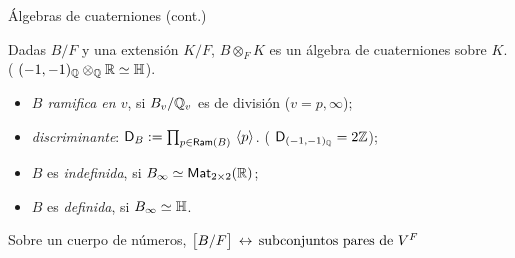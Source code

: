 \begin{frame}{\'{A}lgebras de cuaterniones (cont.)}
	\begin{obsExtension}\label{obs:extension}
		Dadas $B/F$ y una extensi\'{o}n $K/F$, $B\otimes_F K$ es un
		\'{a}lgebra de cuaterniones sobre $K$. (%
		\begin{math}
			\quatalg[\bb Q]{-1,-1}\otimes_{\bb Q}\bb R\simeq\bb H
		\end{math}).
	\end{obsExtension}

	\begin{defRamifica}\label{def:ramifica}
		\begin{itemize}
			\item\emph{$B$ ramifica en $v$}, si $B_v/\bb Q_v$ es de
				divisi\'{o}n ($v=p,\infty$);
			\item\emph{discriminante}:
				\begin{math}
					\disc[B]:=\prod_{p\in\Ram(B)}\,
						\generado{p}
				\end{math}. (%
				\begin{math}
					\disc[{\quatalg[\bb Q]{-1,-1}}]=2\bb Z
				\end{math});
			\item $B$ es \emph{indefinida}, si
				$B_\infty\simeq\MM[2\times2](\bb R)$;
			\item $B$ es \emph{definida}, si
				$B_{\infty}\simeq\bb H$.
		\end{itemize}
	\end{defRamifica}

	\begin{teoClasificacion}%
		\label{thm:clasificacionglobal}
		Sobre un cuerpo de n\'{u}meros,
		\begin{math}
			\big[B/F\big] \,\leftrightarrow\,
				\text{subconjuntos pares de }\lugares{F}
		\end{math}
	\end{teoClasificacion}
\end{frame}

